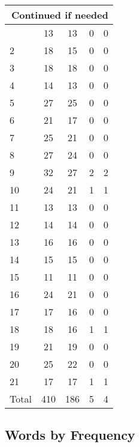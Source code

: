 \begin{center}
\begin{longtable}{l|c|c|c|c}
\hline \multicolumn{5}{|r|}{{Continued if needed}} \\ \hline
\endfoot 
1 & 13 & 13 & 0 & 0\\ \hline
2 & 18 & 15 & 0 & 0\\ \hline
3 & 18 & 18 & 0 & 0\\ \hline
4 & 14 & 13 & 0 & 0\\ \hline
5 & 27 & 25 & 0 & 0\\ \hline
6 & 21 & 17 & 0 & 0\\ \hline
7 & 25 & 21 & 0 & 0\\ \hline
8 & 27 & 24 & 0 & 0\\ \hline
9 & 32 & 27 & 2 & 2\\ \hline
10 & 24 & 21 & 1 & 1\\ \hline
11 & 13 & 13 & 0 & 0\\ \hline
12 & 14 & 14 & 0 & 0\\ \hline
13 & 16 & 16 & 0 & 0\\ \hline
14 & 15 & 15 & 0 & 0\\ \hline
15 & 11 & 11 & 0 & 0\\ \hline
16 & 24 & 21 & 0 & 0\\ \hline
17 & 17 & 16 & 0 & 0\\ \hline
18 & 18 & 16 & 1 & 1\\ \hline
19 & 21 & 19 & 0 & 0\\ \hline
20 & 25 & 22 & 0 & 0\\ \hline
21 & 17 & 17 & 1 & 1\\ \hline
\hline \hline
Total & 410 & 186 & 5 & 4




\end{longtable}
\end{center}



\subsection{Words by Frequency}

